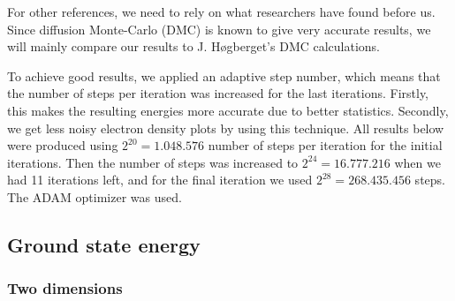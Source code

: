 For other references, we need to rely on what researchers have found before us. Since diffusion Monte-Carlo (DMC) is known to give very accurate results, we will mainly compare our results to J. Høgberget's DMC calculations. \cite{hogberget_quantum_2013}

To achieve good results, we applied an adaptive step number, which means that the number of steps per iteration was increased for the last iterations. Firstly, this makes the resulting energies more accurate due to better statistics. Secondly, we get less noisy electron density plots by using this technique. All results below were produced using $2^{20}=1.048.576$ number of steps per iteration for the initial iterations. Then the number of steps was increased to $2^{24}=16.777.216$ when we had 11 iterations left, and for the final iteration we used $2^{28}=268.435.456$ steps. The ADAM optimizer was used.

\subsection{Ground state energy}

\subsubsection{Two dimensions}

